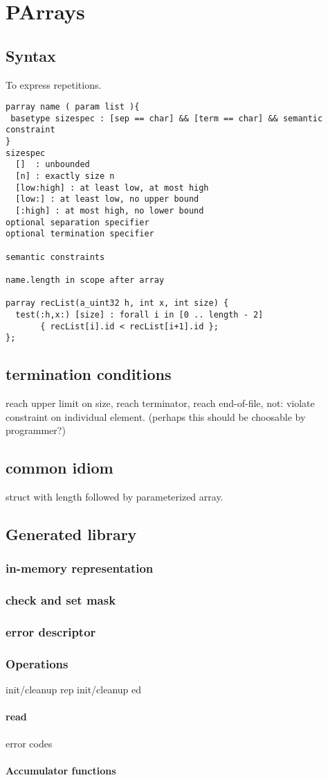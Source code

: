 \chapter{PArrays}
\label{chap:arrays}
\section{Syntax}
To express repetitions.  

\begin{verbatim}
parray name ( param list ){
 basetype sizespec : [sep == char] && [term == char] && semantic constraint
}
sizespec 
  []  : unbounded
  [n] : exactly size n
  [low:high] : at least low, at most high
  [low:] : at least low, no upper bound
  [:high] : at most high, no lower bound
optional separation specifier
optional termination specifier

semantic constraints

name.length in scope after array

parray recList(a_uint32 h, int x, int size) {
  test(:h,x:) [size] : forall i in [0 .. length - 2]
       { recList[i].id < recList[i+1].id };
};
\end{verbatim}
\section{termination conditions}
reach upper limit on size, reach terminator, reach end-of-file, 
not: violate constraint on individual element. (perhaps this should be
choosable by programmer?)


\section{common idiom}
struct with length followed by parameterized array.


\section{Generated library}
\subsection{in-memory representation}
\subsection{check and set mask}
\subsection{error descriptor}
\subsection{Operations}
init/cleanup rep
init/cleanup ed
\subsubsection{read}
  error codes
\subsubsection{Accumulator functions}

